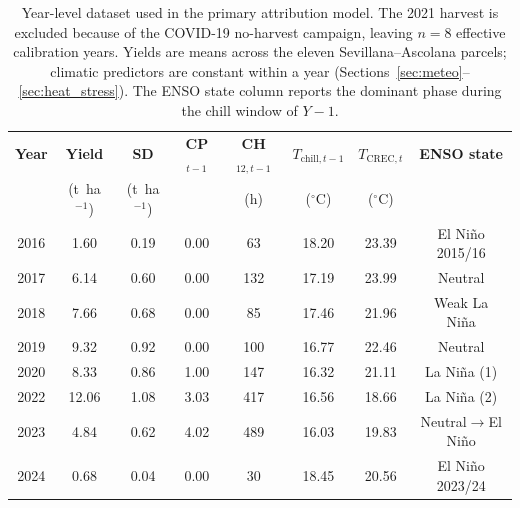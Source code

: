 \begin{table}[H]
\caption{Year-level dataset used in the primary attribution model. The 2021 harvest is excluded because of the COVID-19 no-harvest campaign, leaving $n=8$ effective calibration years. Yields are means across the eleven Sevillana--Ascolana parcels; climatic predictors are constant within a year (Sections~\ref{sec:meteo}--\ref{sec:heat_stress}). The ENSO state column reports the dominant phase during the chill window of $Y-1$.\label{tab:year_level}}
\centering
\small
\begin{tabular}{cccccccc}
\toprule
\textbf{Year} & \textbf{Yield} & \textbf{SD} & \textbf{CP$_{t-1}$} & \textbf{CH$_{12,t-1}$} & \textbf{$T_{\text{chill},t-1}$} & \textbf{$T_{\text{CREC},t}$} & \textbf{ENSO state} \\
              & (t~ha$^{-1}$)  & (t~ha$^{-1}$) &                  & (h)                    & ($^\circ$C)                     & ($^\circ$C)                  &                       \\
\midrule
2016 & 1.60  & 0.19 & 0.00 &  63 & 18.20 & 23.39 & El Ni\~{n}o 2015/16 \\
2017 & 6.14  & 0.60 & 0.00 & 132 & 17.19 & 23.99 & Neutral             \\
2018 & 7.66  & 0.68 & 0.00 &  85 & 17.46 & 21.96 & Weak La Ni\~{n}a    \\
2019 & 9.32  & 0.92 & 0.00 & 100 & 16.77 & 22.46 & Neutral             \\
2020 & 8.33  & 0.86 & 1.00 & 147 & 16.32 & 21.11 & La Ni\~{n}a (1)     \\
2022 & 12.06 & 1.08 & 3.03 & 417 & 16.56 & 18.66 & La Ni\~{n}a (2)     \\
2023 & 4.84  & 0.62 & 4.02 & 489 & 16.03 & 19.83 & Neutral$\rightarrow$El Ni\~{n}o \\
2024 & 0.68  & 0.04 & 0.00 &  30 & 18.45 & 20.56 & El Ni\~{n}o 2023/24 \\
\bottomrule
\end{tabular}
\end{table}
